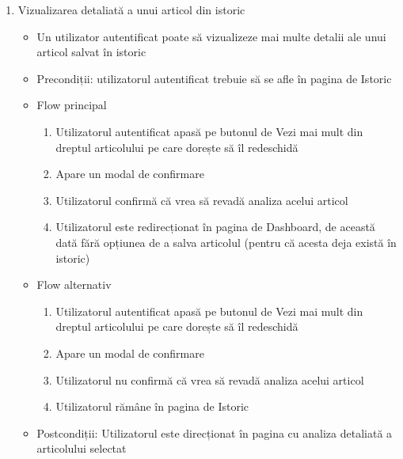 \begin{enumerate}
    \item Vizualizarea detaliată a unui articol din istoric
    \begin{itemize}
        \setlength\itemsep{0.5em}
        \item Un utilizator autentificat poate să vizualizeze mai multe detalii ale unui articol salvat în istoric
        \item Precondiții: utilizatorul autentificat trebuie să se afle în pagina de Istoric
        \item Flow principal
        \begin{enumerate}
            \setlength\itemsep{0.5em}
            \item Utilizatorul autentificat apasă pe butonul de Vezi mai mult din dreptul articolului pe care dorește să îl redeschidă
            \item Apare un modal de confirmare
            \item Utilizatorul confirmă că vrea să revadă analiza acelui articol
            \item Utilizatorul este redirecționat în pagina de Dashboard, de această dată fără opțiunea de a salva articolul (pentru că acesta deja există în istoric)
        \end{enumerate}
        \item Flow alternativ
        \begin{enumerate}
            \setlength\itemsep{0.5em}
            \item Utilizatorul autentificat apasă pe butonul de Vezi mai mult din dreptul articolului pe care dorește să îl redeschidă
            \item Apare un modal de confirmare
            \item Utilizatorul nu confirmă că vrea să revadă analiza acelui articol
            \item Utilizatorul rămâne în pagina de Istoric
        \end{enumerate}
        \item Postcondiții: Utilizatorul este direcționat în pagina cu analiza detaliată a articolului selectat
    \end{itemize}



\end{enumerate}
